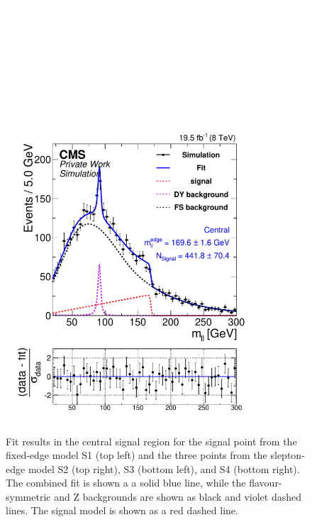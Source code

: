 \begin{figure}[hbp]
\begin{minipage}[t]{0.49\textwidth}
    \includegraphics[width=\textwidth]{plots/results/fit/mcFits/fit2012_ETHTriangle_SignalInclusive_Combined_Full2012_ETHTriangle_MC_SignalInjected_slepton_450_275_100_Central.pdf}
  \end{minipage}
  \caption{Fit results in the central signal region for the signal point from the fixed-edge model S1 (top left) and the three points from the slepton-edge model S2 (top right), S3 (bottom left), and S4 (bottom right). The combined fit is shown a a solid blue line, while the flavour-symmetric and Z backgrounds are shown as black and violet dashed lines. The signal model is shown as a red dashed line.}
  \label{fig:mc:signalInjection}
\end{figure}




